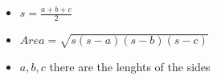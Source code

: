 \begin{itemize}
\item $s = \frac{a+b+c}{2}$
\item $Area = \sqrt{s(s-a)(s-b)(s-c)}$
\item $a, b, c$ there are the lenghts of the sides
\end{itemize}
